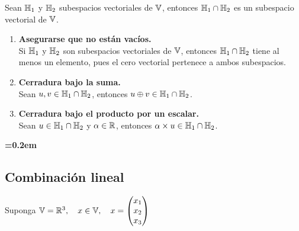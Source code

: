 \begin{teorema}
{
    Sean $\mathbb{H}_1$ y $\mathbb{H}_2$ subespacios vectoriales de $\mathbb{V}$, entonces $\mathbb{H}_1 \cap \mathbb{H}_2$ es un subespacio vectorial de $\mathbb{V}$.\\

    \begin{enumerate}
        \item \textbf{Asegurarse que no están vacíos.} \\
            Si $\mathbb{H}_1$ y $\mathbb{H}_2$ son subespacios vectoriales de $\mathbb{V}$, entonces $\mathbb{H}_1 \cap \mathbb{H}_2$ tiene al menos un elemento, pues el cero vectorial pertenece a ambos subespacios. \\
        \item \textbf{Cerradura bajo la suma.} \\
            Sean $u, v \in \mathbb{H}_1 \cap \mathbb{H}_2$, entonces $u \oplus v \in \mathbb{H}_1 \cap \mathbb{H}_2$. \\
        \item \textbf{Cerradura bajo el producto por un escalar.} \\
            Sean $u \in \mathbb{H}_1 \cap \mathbb{H}_2$ y $\alpha \in \mathbb{R}$, entonces $\alpha \times u \in \mathbb{H}_1 \cap \mathbb{H}_2$.
    \end{enumerate}

    \vspace*{1em}

    \begin{center}
        \textbf{{\fboxsep=0.2em }}
    \end{center}
}
\end{teorema}

\subsection{Combinación lineal}

\begin{center}
    Suponga $\mathbb{V} = \mathbb{R}^3, \quad x \in \mathbb{V}, \quad x = \begin{pmatrix}
        x_1 \\
        x_2 \\
        x_3
    \end{pmatrix}$
\end{center}

